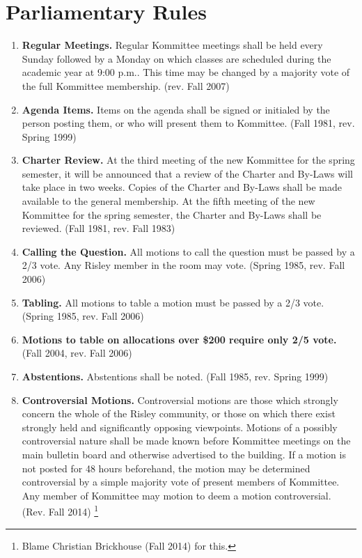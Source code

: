 \documentclass[12pt]{article}
\begin{document}
\section*{Parliamentary Rules}
\begin{enumerate}[1.]
\item \textbf{Regular Meetings.} Regular Kommittee meetings shall be held every Sunday followed by a Monday on which classes are scheduled during the academic year at 9:00 p.m.. This time may be changed by a majority vote of the full Kommittee membership. (rev. Fall 2007)
\item \textbf{Agenda Items.} Items on the agenda shall be signed or initialed by the person posting them, or who will present them to Kommittee. (Fall 1981, rev. Spring 1999)
\item \textbf{Charter Review.} At the third meeting of the new Kommittee for the spring semester, it will be announced that a review of the Charter and By-Laws will take place in two weeks. Copies of the Charter and By-Laws shall be made available to the general membership. At the fifth meeting of the new Kommittee for the spring semester, the Charter and By-Laws shall be reviewed. (Fall 1981, rev. Fall 1983)
\item \textbf{Calling the Question.} All motions to call the question must be passed by a 2/3 vote. Any Risley member in the room may vote. (Spring 1985, rev. Fall 2006)
\item \textbf{Tabling.} All motions to table a motion must be passed by a 2/3 vote. (Spring 1985, rev. Fall 2006)
\item \textbf{Motions to table on allocations over \$200 require only 2/5 vote.} (Fall 2004, rev. Fall 2006)
\item \textbf{Abstentions.} Abstentions shall be noted. (Fall 1985, rev. Spring 1999)
\item \textbf{Controversial Motions.} Controversial motions are those which strongly concern the whole of the Risley community, or those on which there exist strongly held and significantly opposing viewpoints. Motions of a possibly controversial nature shall be made known before Kommittee meetings on the main bulletin board and otherwise advertised to the building. If a motion is not posted for 48 hours beforehand, the motion may be determined controversial by a simple majority vote of present members of Kommittee. Any member of Kommittee may motion to deem a motion controversial. (Rev. Fall 2014) \footnote{Blame Christian Brickhouse (Fall 2014) for this.}
\begin{enumerate}[A.]

\end{enumerate}
\end{enumerate}
\end{document}
